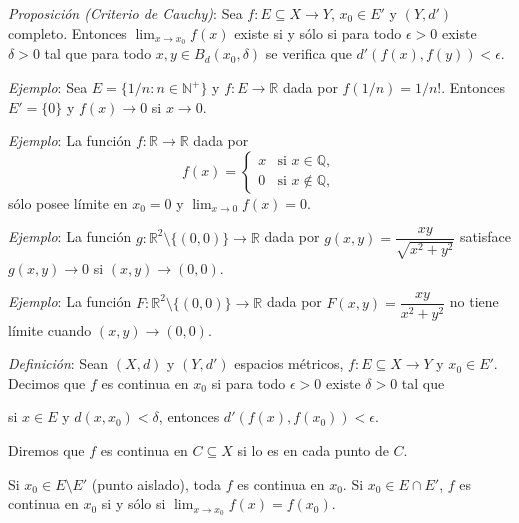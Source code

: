 \documentclass{beamer}
\begin{document}
  \begin{frame}
    \textit{Proposición (Criterio de Cauchy)}: Sea $f: E \subseteq X \to Y$, 
    $x_0 \in E'$ y $(Y, d')$ completo. Entonces $\lim_{x \to x_0} f(x)$ existe si y 
    sólo si para todo $\epsilon > 0$ existe $\delta > 0$ tal que para todo 
    $x, y \in B_d(x_0, \delta)$ se verifica que $d'(f(x), f(y)) < \epsilon$.
  \end{frame}

  \begin{frame}
    \textit{Ejemplo}: Sea $E = \{1/n : n \in \mathbb{N}^+\}$ y $f: E \to \mathbb{R}$ dada 
    por $f(1/n) = 1/n!$. Entonces $E' = \{0\}$ y $f(x) \to 0$ si $x \to 0$.
    \newline\newline
    \pause

    \textit{Ejemplo}: La función $f: \mathbb{R} \to \mathbb{R}$ dada por
    \[
      f(x) = \begin{cases} x & \text{si } x \in \mathbb{Q}, \\ 0 & \text{si } x \notin \mathbb{Q}, \end{cases}
    \]
    sólo posee límite en $x_0 = 0$ y $\lim_{x \to 0} f(x) = 0$.
  \end{frame}

  \begin{frame}
    \textit{Ejemplo}: La función $g: \mathbb{R}^2 \setminus \{(0,0)\} \to \mathbb{R}$ 
    dada por $g(x, y) = \dfrac{xy}{\sqrt{x^2 + y^2}}$ satisface $g(x, y) \to 0$ si 
    $(x, y) \to (0, 0)$.
    \newline\newline
    \pause

    \textit{Ejemplo}: La función $F: \mathbb{R}^2 \setminus \{(0,0)\} \to \mathbb{R}$ 
    dada por $F(x, y) = \dfrac{xy}{x^2 + y^2}$ no tiene límite cuando 
    $(x, y) \to (0, 0)$.
  \end{frame}

  \begin{frame}
    \textit{Definición}: Sean $(X, d)$ y $(Y, d')$ espacios métricos, 
    $f: E \subseteq X \to Y$ y $x_0 \in E'$. Decimos que $f$ es continua en $x_0$ 
    si para todo $\epsilon > 0$ existe $\delta > 0$ tal que
    \begin{center}
      si $x \in E$ y $d(x, x_0) < \delta$, entonces $d'(f(x), f(x_0)) < \epsilon$.
    \end{center}
    \pause

    Diremos que $f$ es continua en $C \subseteq X$ si lo es en cada punto de $C$.
    \newline\newline
    \pause

    Si $x_0 \in E \setminus E'$ (punto aislado), toda $f$ es continua en $x_0$. Si 
    $x_0 \in E \cap E'$, $f$ es continua en $x_0$ si y sólo si 
    $\lim_{x \to x_0} f(x) = f(x_0)$.
  \end{frame}
\end{document}
